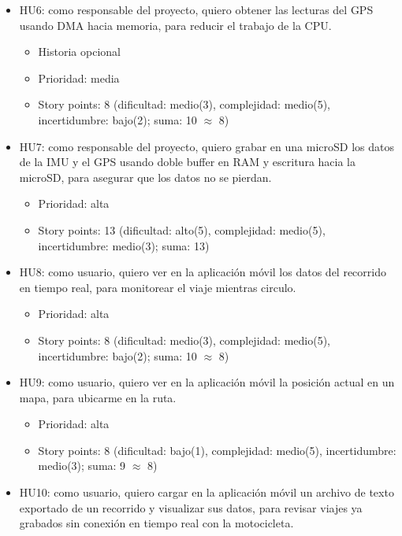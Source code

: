 \documentclass[
11pt, %
]{charter}
\begin{document}
\begin{itemize}
\begin{itemize}
      \item Story points: 8 (dificultad: medio(3), complejidad: medio(5), incertidumbre: bajo(2); suma: 10 $\approx$ 8)
    \end{itemize}
    \item HU6: como responsable del proyecto, quiero obtener las lecturas del GPS usando DMA hacia memoria, para reducir el trabajo de la CPU.
    \begin{itemize}
      \item Historia opcional
      \item Prioridad: media
      \item Story points: 8 (dificultad: medio(3), complejidad: medio(5), incertidumbre: bajo(2); suma: 10 $\approx$ 8)
    \end{itemize}
    \item HU7: como responsable del proyecto, quiero grabar en una microSD los datos de la IMU y el GPS usando doble buffer en RAM y escritura hacia la microSD, para asegurar que los datos no se pierdan.
    \begin{itemize}
      \item Prioridad: alta
      \item Story points: 13 (dificultad: alto(5), complejidad: medio(5), incertidumbre: medio(3); suma: 13)
    \end{itemize}
    \item HU8: como usuario, quiero ver en la aplicación móvil los datos del recorrido en tiempo real, para monitorear el viaje mientras circulo.
    \begin{itemize}
      \item Prioridad: alta
      \item Story points: 8 (dificultad: medio(3), complejidad: medio(5), incertidumbre: bajo(2); suma: 10 $\approx$ 8)
    \end{itemize}
    \item HU9: como usuario, quiero ver en la aplicación móvil la posición actual en un mapa, para ubicarme en la ruta.
    \begin{itemize}
      \item Prioridad: alta
      \item Story points: 8 (dificultad: bajo(1), complejidad: medio(5), incertidumbre: medio(3); suma: 9 $\approx$ 8)
    \end{itemize}
    \item HU10: como usuario, quiero cargar en la aplicación móvil un archivo de texto exportado de un recorrido y visualizar sus datos, para revisar viajes ya grabados sin conexión en tiempo real con la motocicleta.

\end{itemize}
\end{document}
